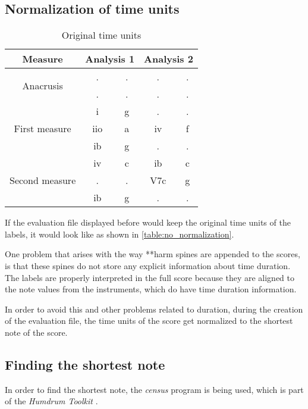   \subsection{Normalization of time units}

		\begin{table}[tbp]
		\centering
		\begin{tabular}{|c|c|c|c|c|}
		\hline
		Measure & \multicolumn{2}{c|}{Analysis 1} & \multicolumn{2}{c|}{Analysis 2} \\ \hline
		\multirow{2}{*}{Anacrusis} & . & . & . & . \\ \cline{2-5}
		 & . & . & . & . \\ \hline
		\multirow{3}{*}{First measure} & i & g & . & . \\ \cline{2-5}
		 & iio & a & iv & f \\ \cline{2-5}
		 & ib & g & . & . \\ \hline
		\multirow{3}{*}{Second measure} & iv & c & ib & c \\ \cline{2-5}
		 & . & . & V7c & g \\ \cline{2-5}
		 & ib & g & . & . \\ \hline
		\end{tabular}
		\caption{Original time units}
		\label{table:no_normalization}
		\end{table}

		If the evaluation file displayed before would keep the original time units of the labels, it would look like as shown in \autoref{table:no_normalization}.

		One problem that arises with the way **harm spines are appended to the scores, is that these spines do not store any explicit information about time duration. The labels are properly interpreted in the full score because they are aligned to the note values from the instruments, which do have time duration information.

		In order to avoid this and other problems related to duration, during the creation of the evaluation file, the time units of the score get normalized to the shortest note of the score.

	\subsection{Finding the shortest note}
		In order to find the shortest note, the \emph{census} program is being used, which is part of the \emph{Humdrum Toolkit} \cite{humdrum}.


